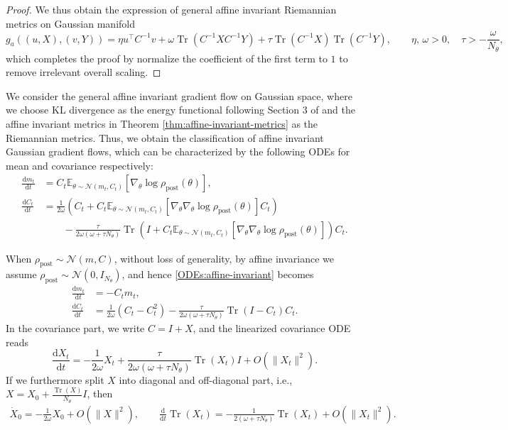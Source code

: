 \documentclass[11pt]{article}
\theoremstyle{plain}
\theoremstyle{definition}
\theoremstyle{remark}
\newcommand{\N}{\mathcal{N}}
\newcommand{\E}{\mathbb{E}}
\newcommand{\Tr}{\operatorname{Tr}}
\newcommand{\post}{\mathrm{post}}
\newcommand{\dd}{\mathrm{d}}
\begin{document}
\begin{proof}
    We thus obtain the expression of general affine invariant Riemannian metrics on Gaussian manifold
    \begin{equation*}
        g_{a} ((u, X), (v, Y)) = \eta u^\top C^{-1} v + \omega \Tr(C^{-1} X C^{-1} Y) + \tau \Tr(C^{-1} X ) \Tr(C^{-1} Y), \qquad \eta,\, \omega > 0,\quad \tau > - \frac{\omega}{N_\theta},
    \end{equation*}
    which completes the proof by normalize the coefficient of the first term to $1$ to remove irrelevant overall scaling.
\end{proof}


We consider the general affine invariant gradient flow on Gaussian space, where we choose KL divergence as the energy functional following Section 3 of \cite{chen2023sampling} and the affine invariant metrics in Theorem \ref{thm:affine-invariant-metrics} as the Riemannian metrics. Thus, we obtain the classification of affine invariant Gaussian gradient flows, which can be characterized by the following ODEs for mean and covariance respectively:
\begin{equation}\label{ODEs:affine-invariant}
    \begin{aligned}
        \frac{\dd m_t}{\dd t} &= C_t \E_{\theta \sim \N(m_t, C_t)} [\nabla_\theta \log \rho_\post(\theta)], \\
        \frac{\dd C_t}{\dd t} &= \frac{1}{2 \omega} (C_t + C_t \E_{\theta \sim \N(m_t, C_t)} [\nabla_\theta \nabla_\theta \log \rho_\post(\theta)] C_t) \\
        &\qquad - \frac{\tau}{2\omega (\omega + \tau N_\theta)} \Tr (I + C_t \E_{\theta \sim \N(m_t, C_t)} [\nabla_\theta \nabla_\theta \log \rho_\post(\theta)]) C_t.
    \end{aligned}
\end{equation}

When $\rho_\post \sim \N(m, C)$, without loss of generality, by affine invariance we assume $\rho_\post \sim \N(0, I_{N_\theta})$, and hence \eqref{ODEs:affine-invariant} becomes
\begin{equation*}
    \begin{aligned}
        \frac{\dd m_t}{\dd t} &= -C_t m_t, \\
        \frac{\dd C_t}{\dd t} &= \frac{1}{2\omega} (C_t - C_t^2) - \frac{\tau}{2\omega (\omega + \tau N_\theta)} \Tr (I - C_t) C_t.
    \end{aligned}
\end{equation*}
In the covariance part, we write $C = I + X$, and the linearized covariance ODE reads
\begin{equation*}
    \frac{\dd X_t}{\dd t} = -\frac{1}{2\omega} X_t + \frac{\tau}{2\omega (\omega + \tau N_\theta)} \Tr(X_t) I + O(\|X_t\|^2).
\end{equation*}
If we furthermore split $X$ into diagonal and off-diagonal part, i.e., $X = X_0 + \frac{\Tr (X)}{N_\theta} I$, then
\begin{align*}
    \dot X_0 = -\frac{1}{2\omega} X_0 + O(\|X\|^2), \qquad \frac{\dd}{\dd t} \Tr(X_t) = -\frac{1}{2(\omega + \tau N_\theta)} \Tr(X_t) + O(\|X_t\|^2).
\end{align*}
\end{document}
